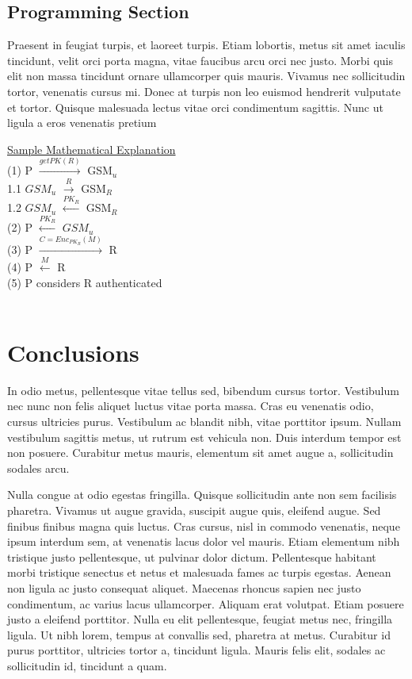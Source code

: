 \documentclass[11pt, fullpage]{article}
\begin{document}
\subsection{Programming Section}

Praesent in feugiat turpis, et laoreet turpis. Etiam lobortis, metus sit amet iaculis tincidunt, velit orci porta magna, vitae faucibus arcu orci nec justo. Morbi quis elit non massa tincidunt ornare ullamcorper quis mauris. Vivamus nec sollicitudin tortor, venenatis cursus mi. Donec at turpis non leo euismod hendrerit vulputate et tortor. Quisque malesuada lectus vitae orci condimentum sagittis. Nunc ut ligula a eros venenatis pretium

\begin{center}
\begin{parbox}[t]{.45\linewidth}{\textsf{\underline{Sample Mathematical Explanation} \\
(1) P $\xrightarrow{getPK(R)}$ GSM$_u$ \\
1.1 $GSM_u$ $\xrightarrow{R}$ GSM$_R$\\
1.2 $GSM_u$ $\xleftarrow{PK_R}$ GSM$_R$\\
(2) P $\xleftarrow{PK_R}$ $GSM_u$ \\
(3) P $\xrightarrow{C=Enc_{PK_R}(M)}$ R \\
(4) P $\xleftarrow{M}$ R \\
(5) P considers R authenticated \\
\hfill
}}
\\
\end{parbox}
\end{center}

\section[\bf \uppercase{Conclusions}]{Conclusions}
\label{sec-conclusion}
In odio metus, pellentesque vitae tellus sed, bibendum cursus tortor. Vestibulum nec nunc non felis aliquet luctus vitae porta massa. Cras eu venenatis odio, cursus ultricies purus. Vestibulum ac blandit nibh, vitae porttitor ipsum. Nullam vestibulum sagittis metus, ut rutrum est vehicula non. Duis interdum tempor est non posuere. Curabitur metus mauris, elementum sit amet augue a, sollicitudin sodales arcu.

Nulla congue at odio egestas fringilla. Quisque sollicitudin ante non sem facilisis pharetra. Vivamus ut augue gravida, suscipit augue quis, eleifend augue. Sed finibus finibus magna quis luctus. Cras cursus, nisl in commodo venenatis, neque ipsum interdum sem, at venenatis lacus dolor vel mauris. Etiam elementum nibh tristique justo pellentesque, ut pulvinar dolor dictum. Pellentesque habitant morbi tristique senectus et netus et malesuada fames ac turpis egestas. Aenean non ligula ac justo consequat aliquet. Maecenas rhoncus sapien nec justo condimentum, ac varius lacus ullamcorper. Aliquam erat volutpat. Etiam posuere justo a eleifend porttitor. Nulla eu elit pellentesque, feugiat metus nec, fringilla ligula. Ut nibh lorem, tempus at convallis sed, pharetra at metus. Curabitur id purus porttitor, ultricies tortor a, tincidunt ligula. Mauris felis elit, sodales ac sollicitudin id, tincidunt a quam.
\end{document}
